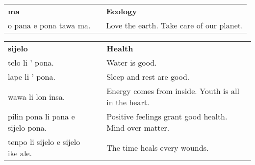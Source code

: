 \begin{supertabular}{p{6cm}|ll}
    \textbf{ma}            &  & \textbf{Ecology}                         \\
    o pana e pona tawa ma. &  & Love the earth. Take care of our planet. \\
\end{supertabular}

\begin{supertabular}{p{6cm}|ll}
    \textbf{sijelo}                   &  & \textbf{Health}                                        \\
    telo li ' pona.                   &  & Water is good.                                         \\
    lape li ' pona.                   &  & Sleep and rest are good.                               \\
    wawa li lon insa.                 &  & Energy comes from inside. Youth is all in the heart.   \\
    pilin pona li pana e sijelo pona. &  & Positive feelings grant good health. Mind over matter. \\
    tenpo li sijelo e sijelo ike ale. &  & The time heals every wounds.                           \\
\end{supertabular}
